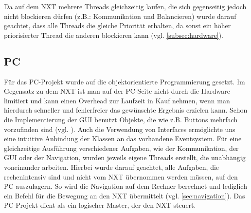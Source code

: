 \documentclass[oneside,abstractoff,a4paper]{scrartcl}
\begin{document}
Da auf dem NXT mehrere Threads gleichzeitig laufen, die sich gegenseitig jedoch nicht blockieren dürfen (z.B.: Kommunikation und Balancieren) wurde darauf geachtet, dass alle Threads die gleiche Priorität erhalten, da sonst ein höher priorisierter Thread die anderen blockieren kann (vgl. \cref{subsec:hardware}).

\subsection{PC}

Für das PC-Projekt wurde auf die objektorientierte Programmierung gesetzt. Im Gegensatz zu dem NXT ist man auf der PC-Seite nicht durch die Hardware limitiert und kann einen Overhead zur Laufzeit in Kauf nehmen, wenn man hierdurch schneller und fehlerfreier das gewünschte Ergebnis erzielen kann. Schon die Implementierung der GUI benutzt Objekte, die wie z.B. Buttons mehrfach vorzufinden sind (vgl. ). Auch die Verwendung von Interfaces ermöglichte uns eine intuitive Anbindung der Klassen an das vorhandene Eventsystem. Für eine gleichzeitige Ausführung verschiedener Aufgaben, wie der Kommunikation, der GUI oder der Navigation, wurden jeweils eigene Threads erstellt, die unabhängig voneinander arbeiten. Hierbei wurde darauf geachtet, alle Aufgaben, die rechenintensiv sind und nicht vom NXT übernommen werden müssen, auf den PC auszulagern. So wird die Navigation auf dem Rechner berechnet und lediglich ein Befehl für die Bewegung an den NXT übermittelt (vgl. \cref{sec:navigation}). Das PC-Projekt dient als ein logischer Master, der den NXT steuert. 
\end{document}
